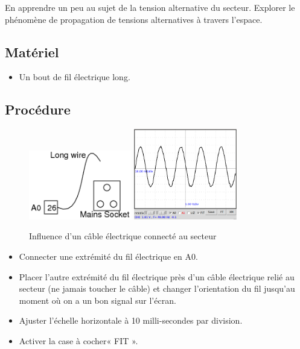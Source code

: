 \documentclass{book}
\begin{document}
En apprendre un peu au sujet de la tension alternative du secteur. Explorer le phénomène de propagation de tensions alternatives à travers l'espace.




\subsection{Matériel}


\begin{itemize}
  \item Un bout de fil électrique long.
\end{itemize}

\subsection{Procédure}


\begin{figure}[h!]
\begin{center}
\caption{\label{fig:Power-line-pickup}Influence d'un câble électrique connecté au secteur }\vspace{0.5em}
\includegraphics[width=0.4\textwidth, height=0.3\textwidth, keepaspectratio]{Schematic-pickup.png}
\includegraphics[width=0.4\textwidth, height=0.3\textwidth, keepaspectratio]{Pic-sinewave50hz.png}
\end{center}
\end{figure}



\begin{itemize}
  \item Connecter une extrémité du fil électrique en A0.
  \item Placer l'autre extrémité du fil électrique près d'un câble électrique relié au secteur (ne jamais toucher le câble) et changer l'orientation du fil jusqu'au moment où on a un bon signal sur l'écran.
  \item Ajuster l'échelle horizontale à 10 milli-secondes par division.
  \item Activer la case à cocher« FIT ».
\end{itemize}
\end{document}
